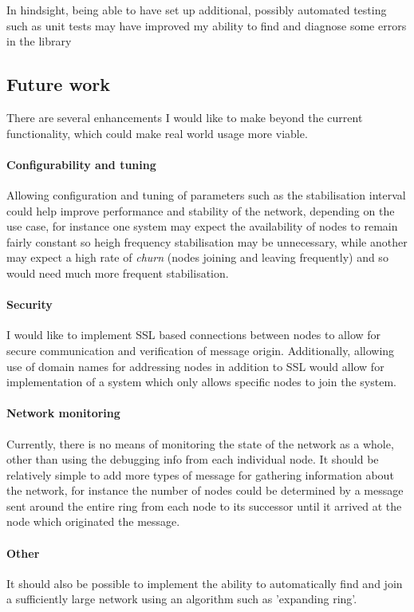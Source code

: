 \documentclass{article}
\begin{document}
In hindsight, being able to have set up additional, possibly automated testing such as unit tests may have improved my ability to find and diagnose some errors in the library


\subsection{Future work}

There are several enhancements I would like to make beyond the current functionality, which could make real world usage more viable.
\paragraph{Configurability and tuning} Allowing configuration and tuning of parameters such as the stabilisation interval could help improve performance and stability of the network, depending on the use case, for instance one system may expect the availability of nodes to remain fairly constant so heigh frequency stabilisation may be unnecessary, while another may expect a high rate of \textit{churn} (nodes joining and leaving frequently) and so would need much more frequent stabilisation.

\paragraph{Security} I would like to implement SSL based connections between nodes to allow for secure communication and verification of message origin.
Additionally, allowing use of domain names for addressing nodes in addition to SSL would allow for implementation of a system which only allows specific nodes to join the system.

\paragraph{Network monitoring} Currently, there is no means of monitoring the state of the network as a whole, other than using the debugging info from each individual node. It should be relatively simple to add more types of message for gathering information about the network, for instance the number of nodes could be determined by a message sent around the entire ring from each node to its successor until it arrived at the node which originated the message.


\paragraph{Other} It should also be possible to implement the ability to automatically find and join a sufficiently large network using an algorithm such as 'expanding ring'.
\end{document}

